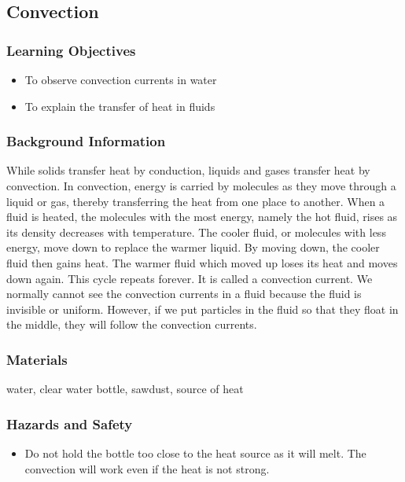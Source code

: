 \subsection{Convection}

\subsubsection*{Learning Objectives}
\begin{itemize}
\item{To observe convection currents in water}
\item{To explain the transfer of heat in fluids}
\end{itemize}

\subsubsection*{Background Information}
While solids transfer heat by conduction, liquids and gases transfer heat by convection.  In convection, energy is carried by molecules as they move through a liquid or gas, thereby transferring the heat from one place to another.
When a fluid is heated, the molecules with the most energy, namely the hot fluid, rises as its density decreases with temperature.  The cooler fluid, or molecules with less energy, move down to replace the warmer liquid.  By moving down, the cooler fluid then gains heat.  The warmer fluid which moved up loses its heat and moves down again.  This cycle repeats forever.  It is called a convection current.
We normally cannot see the convection currents in a fluid because the fluid is invisible or uniform.  However, if we put particles in the fluid so that they float in the middle, they will follow the convection currents.

\subsubsection*{Materials}
water, clear water bottle, sawdust, source of heat

\subsubsection*{Hazards and Safety}
\begin{itemize}
\item{Do not hold the bottle too close to the heat source as it will melt.  The convection will work even if the heat is not strong.}
\end{itemize}

